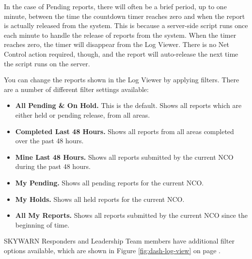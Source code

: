 \documentclass[pdflatex,letterpaper,twoside,12pt]{book}
\begin{document}

In the case of Pending reports, there will often be a brief period, up to one minute, between the time the countdown timer reaches zero and when the report is actually released from the system.  This is because a server-side script runs once each minute to handle the release of reports from the system.  When the timer reaches zero, the timer will disappear from the Log Viewer.  There is no Net Control action required, though, and the report will auto-release the next time the script runs on the server.

You can change the reports shown in the Log Viewer by applying filters.  There are a number of different filter settings available:

\begin{itemize}
\item \textbf{All Pending \& On Hold.}  This is the default.  Shows all reports which are either held or pending release, from all areas.
\item \textbf{Completed Last 48 Hours.}  Shows all reports from all areas completed over the past 48 hours.
\item \textbf{Mine Last 48 Hours.}  Shows all reports submitted by the current NCO during the past 48 hours.
\item \textbf{My Pending.}  Shows all pending reports for the current NCO.
\item \textbf{My Holds.}  Shows all held reports for the current NCO.
\item \textbf{All My Reports.}  Shows all reports submitted by the current NCO since the beginning of time.
\end{itemize}

SKYWARN Responders and Leadership Team members have additional filter options available, which are shown in Figure \ref{fig:dash-log-view} on page \pageref{fig:dash-log-view}.
\end{document}

